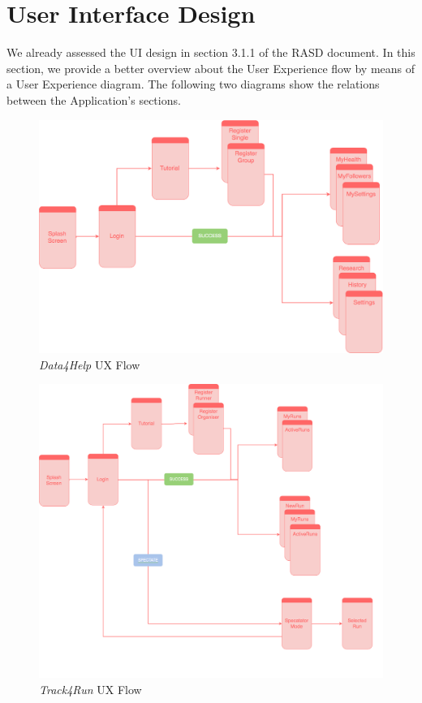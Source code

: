 \documentclass[titlepage]{article}
\begin{document}
\section{User Interface Design}
We already assessed the  UI design in section 3.1.1 of the RASD document. In this section, we provide a better overview about the User Experience flow by means of a User Experience diagram. The following two diagrams show the relations between the Application’s sections.
\begin{figure}[H]
	\center
  	\includegraphics[width=14cm]{UXD4HDiagram.png}
  	\caption{{\it Data4Help} UX Flow}
 	\label{fig:D4HUX}
\end{figure}
\begin{figure}[H]
	\center
  	\includegraphics[width=14cm]{UXT4RDiagram.png}
  	\caption{{\it Track4Run} UX Flow}
 	\label{fig:T4RUX}
\end{figure}
\pagebreak
\end{document}
